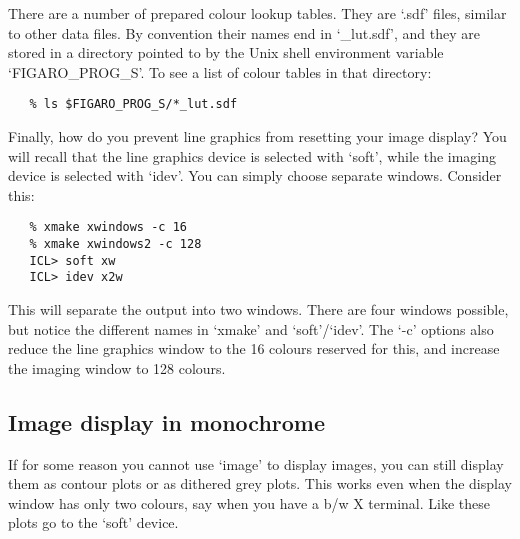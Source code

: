 \begin{latexonly}
\begin{figure}[htb]
\begin{center}
\leavevmode{}
\end{center}
\end{figure}
\end{latexonly}

   There are a number of prepared colour lookup tables. They are
   `.sdf' files, similar to other data files. By convention their
   names end in `\_lut.sdf', and they are stored in a directory pointed
   to by the Unix shell environment variable `FIGARO\_PROG\_S'. To see a
   list of colour tables in that directory:

\begin{verbatim}
   % ls $FIGARO_PROG_S/*_lut.sdf
\end{verbatim}

   Finally, how do you prevent line graphics from resetting your image
   display? You will recall that the line graphics device is selected
   with `soft', while the imaging device is selected with `idev'.
   You can simply choose separate windows. Consider this:

\begin{verbatim}
   % xmake xwindows -c 16
   % xmake xwindows2 -c 128
   ICL> soft xw
   ICL> idev x2w
\end{verbatim}

   This will separate the output into two windows. There are four
   windows possible, but notice the different names in `xmake' and
   `soft'/`idev'. The `-c' options also reduce the line graphics
   window to the 16 colours reserved for this, and increase the imaging
   window to 128 colours.


\subsection{\label{lookicont}Image display in monochrome}

   If for some reason you cannot use `image' to display images, you
   can still display them as contour plots or as dithered grey plots.
   This works even when the display window has only two colours, say
   when you have a b/w X terminal. Like
   {}
   these plots go to the `soft' device.

